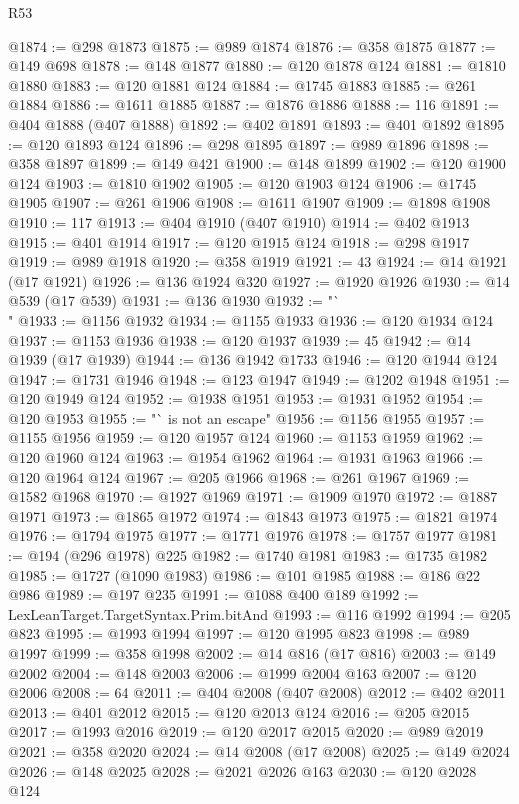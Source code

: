 \begin{lexlean}{R53}
\begin{coremodule}
@1874 := @298 @1873
@1875 := @989 @1874
@1876 := @358 @1875
@1877 := @149 @698
@1878 := @148 @1877
@1880 := @120 @1878 @124
@1881 := @1810 @1880
@1883 := @120 @1881 @124
@1884 := @1745 @1883
@1885 := @261 @1884
@1886 := @1611 @1885
@1887 := @1876 @1886
@1888 := 116
@1891 := @404 @1888 (@407 @1888)
@1892 := @402 @1891
@1893 := @401 @1892
@1895 := @120 @1893 @124
@1896 := @298 @1895
@1897 := @989 @1896
@1898 := @358 @1897
@1899 := @149 @421
@1900 := @148 @1899
@1902 := @120 @1900 @124
@1903 := @1810 @1902
@1905 := @120 @1903 @124
@1906 := @1745 @1905
@1907 := @261 @1906
@1908 := @1611 @1907
@1909 := @1898 @1908
@1910 := 117
@1913 := @404 @1910 (@407 @1910)
@1914 := @402 @1913
@1915 := @401 @1914
@1917 := @120 @1915 @124
@1918 := @298 @1917
@1919 := @989 @1918
@1920 := @358 @1919
@1921 := 43
@1924 := @14 @1921 (@17 @1921)
@1926 := @136 @1924 @320
@1927 := @1920 @1926
@1930 := @14 @539 (@17 @539)
@1931 := @136 @1930
@1932 := "`\\"
@1933 := @1156 @1932
@1934 := @1155 @1933
@1936 := @120 @1934 @124
@1937 := @1153 @1936
@1938 := @120 @1937
@1939 := 45
@1942 := @14 @1939 (@17 @1939)
@1944 := @136 @1942 @1733
@1946 := @120 @1944 @124
@1947 := @1731 @1946
@1948 := @123 @1947
@1949 := @1202 @1948
@1951 := @120 @1949 @124
@1952 := @1938 @1951
@1953 := @1931 @1952
@1954 := @120 @1953
@1955 := "` is not an escape"
@1956 := @1156 @1955
@1957 := @1155 @1956
@1959 := @120 @1957 @124
@1960 := @1153 @1959
@1962 := @120 @1960 @124
@1963 := @1954 @1962
@1964 := @1931 @1963
@1966 := @120 @1964 @124
@1967 := @205 @1966
@1968 := @261 @1967
@1969 := @1582 @1968
@1970 := @1927 @1969
@1971 := @1909 @1970
@1972 := @1887 @1971
@1973 := @1865 @1972
@1974 := @1843 @1973
@1975 := @1821 @1974
@1976 := @1794 @1975
@1977 := @1771 @1976
@1978 := @1757 @1977
@1981 := @194 (@296 @1978) @225
@1982 := @1740 @1981
@1983 := @1735 @1982
@1985 := @1727 (@1090 @1983)
@1986 := @101 @1985
@1988 := @186 @22 @986
@1989 := @197 @235
@1991 := @1088 @400 @189
@1992 := LexLeanTarget.TargetSyntax.Prim.bitAnd
@1993 := @116 @1992
@1994 := @205 @823
@1995 := @1993 @1994
@1997 := @120 @1995 @823
@1998 := @989 @1997
@1999 := @358 @1998
@2002 := @14 @816 (@17 @816)
@2003 := @149 @2002
@2004 := @148 @2003
@2006 := @1999 @2004 @163
@2007 := @120 @2006
@2008 := 64
@2011 := @404 @2008 (@407 @2008)
@2012 := @402 @2011
@2013 := @401 @2012
@2015 := @120 @2013 @124
@2016 := @205 @2015
@2017 := @1993 @2016
@2019 := @120 @2017 @2015
@2020 := @989 @2019
@2021 := @358 @2020
@2024 := @14 @2008 (@17 @2008)
@2025 := @149 @2024
@2026 := @148 @2025
@2028 := @2021 @2026 @163
@2030 := @120 @2028 @124

\end{coremodule}
\end{lexlean}
